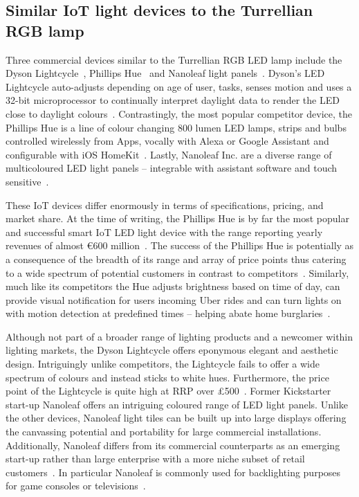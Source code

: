 \documentclass{sigchi}
\begin{document}
\subsection{Similar IoT light devices to the Turrellian RGB lamp}

Three commercial devices similar to the Turrellian RGB LED lamp include the Dyson Lightcycle~\cite{Dyson01}, Phillips Hue~\cite{Phillips01} and Nanoleaf light panels~\cite{Nanoleaf01}. Dyson’s LED Lightcycle auto-adjusts depending on age of user, tasks, senses motion and uses a 32-bit microprocessor to continually interpret daylight data to render the LED close to daylight colours~\cite{Dyson01}. Contrastingly, the most popular competitor device, the Phillips Hue is a line of colour changing 800 lumen LED lamps, strips and bulbs controlled wirelessly from Apps, vocally with Alexa or Google Assistant and configurable with iOS HomeKit~\cite{Phillips01}. Lastly, Nanoleaf Inc. are a diverse range of multicoloured LED light panels – integrable with assistant software and touch sensitive~\cite{Nanoleaf01}. 

These IoT devices differ enormously in terms of specifications, pricing, and market share. At the time of writing, the Phillips Hue is by far the most popular and successful smart IoT LED light device with the range reporting yearly revenues of almost €600 million~\cite{Phillips02}. The success of the Phillips Hue is potentially as a consequence of the breadth of its range and array of price points thus catering to a wide spectrum of potential customers in contrast to competitors~\cite{Phillips01}. Similarly, much like its competitors the Hue adjusts brightness based on time of day, can provide visual notification for users incoming Uber rides and can turn lights on with motion detection at predefined times – helping abate home burglaries~\cite{Phillips01}. 

Although not part of a broader range of lighting products and a newcomer within lighting markets, the Dyson Lightcycle offers eponymous elegant and aesthetic design. Intriguingly unlike competitors, the Lightcycle fails to offer a wide spectrum of colours and instead sticks to white hues. Furthermore, the price point of the Lightcycle is quite high at RRP over £500~\cite{Dyson01}. Former Kickstarter start-up Nanoleaf offers an intriguing coloured range of LED light panels. Unlike the other devices, Nanoleaf light tiles can be built up into large displays offering the canvassing potential and portability for large commercial installations. Additionally, Nanoleaf differs from its commercial counterparts as an emerging start-up rather than large enterprise with a more niche subset of retail customers~\cite{Nanoleaf01}. In particular Nanoleaf is commonly used for backlighting purposes for game consoles or televisions~\cite{Nanoleaf01}.
\end{document}
